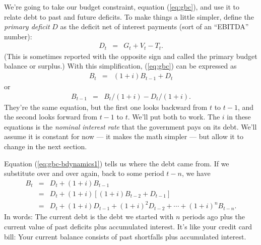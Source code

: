 We're going to take our budget constraint, equation (\ref{eq:gbc}),
and use it to relate debt to past and future deficits.
To make things a little simpler,
define the {\it primary deficit\/}   $D$ as the deficit
net of interest payments (sort of an ``EBITDA'' number):
\begin{eqnarray*}
    D_t &=&  G_t + V_t - T_t .
\end{eqnarray*}
(This is sometimes reported with the opposite
sign and called the primary budget balance or surplus.)
With this simplification, (\ref{eq:gbc}) can be expressed as
\begin{eqnarray}
    B_{t}   &=& (1+i) B_{t-1} + D_t
   \label{eq:gbc-bdynamics1}
\end{eqnarray}
or
\begin{eqnarray}
    B_{t-1}  &=&  B_{t}/(1+i) - D_t/(1+i) .
    \label{eq:gbc-bdynamics2}
\end{eqnarray}
They're the same equation, but the first one looks backward from $t$ to $t-1$,
and the second looks forward from $t-1$ to $t$.
We'll put both to work.
The $i$ in these equations is the \textit{nominal interest rate} that the government pays on its debt.
We'll assume it is constant for now --- it makes the math simpler ---
but allow it to change in the next section.

Equation (\ref{eq:gbc-bdynamics1}) tells us where the debt 
 came from.
If we substitute over and over again, back to some period $t-n$,
we have
\begin{eqnarray*}
    B_{t}  &=& D_t + (1+i) B_{t-1} \\
            &=& D_t + (1+i) [(1+i) B_{t-2} + D_{t-1}] \\
            &=& D_t + (1+i) D_{t-1} + (1+i)^2 D_{t-2} + \cdots + (1+i)^n B_{t-n}.
\end{eqnarray*}
In words:  The current debt is the debt we started with $n$ periods ago
plus the current value of past deficits plus accumulated interest.
It's like your credit card bill: Your current balance consists of past shortfalls plus accumulated interest.



